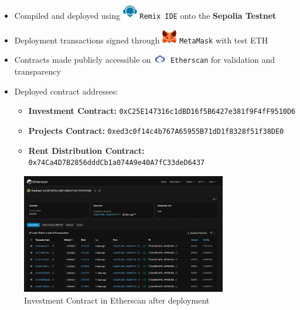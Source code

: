\begin{itemize}
    \item Compiled and deployed using \includegraphics[width=0.05\textwidth]{images/icons/remix.png} \texttt{Remix IDE} onto the \textbf{Sepolia Testnet}
    \item Deployment transactions signed through \includegraphics[width=0.05\textwidth]{images/icons/metamask.png} \texttt{MetaMask} with test ETH
    \item Contracts made publicly accessible on \includegraphics[width=0.05\textwidth]{images/icons/etherscan.png} \texttt{Etherscan} for validation and transparency
    \item Deployed contract addresses:
    \begin{itemize}
        \item \textbf{Investment Contract:} \texttt{0xC25E147316c1dBD16f5B6427e381f9F4fF9510D6}
        \item \textbf{Projects Contract:} \texttt{0xed3c0f14c4b767A65955B71dD1f8328f51f38DE0}
        \item \textbf{Rent Distribution Contract:} \texttt{0x74Ca4D7B2856dddCb1a074A9e40A7fC33deD6437}
    \end{itemize}
\end{itemize}

\newpage
\begin{figure}[htbp]
  \centering
  \includegraphics[width=0.8\textwidth]{images/etherscan_screenshot.png}
  \caption{Investment Contract in Etherscan after deployment}
  \label{fig:etherscan-screenshot}
\end{figure}

